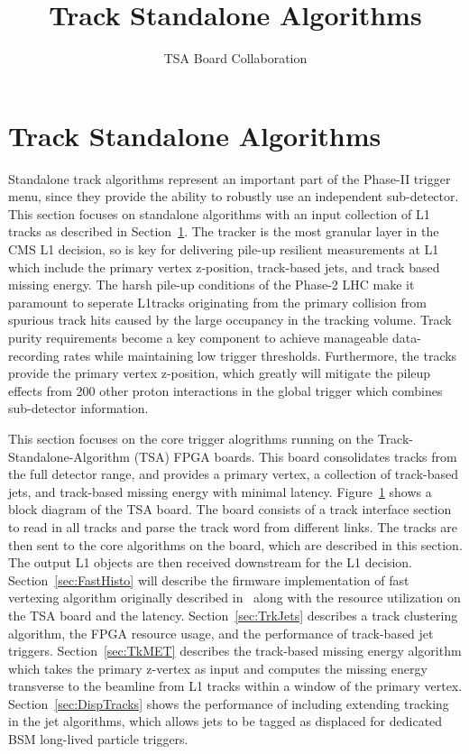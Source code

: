 \documentclass[12pt,a4paper]{article}
\author{TSA Board Collaboration}
\title{Track Standalone Algorithms}
\begin{document}
\section{Track Standalone Algorithms}

Standalone track algorithms represent an important part of the Phase-II trigger menu, since they provide the ability to robustly use an independent sub-detector. This section focuses on standalone algorithms with an input collection of L1 tracks as described in Section~\ref{}. The tracker is the most granular layer in the CMS L1 decision, so is key for delivering pile-up resilient measurements at L1 which include the primary vertex z-position, track-based jets, and track based missing energy. The harsh pile-up conditions of the Phase-2 LHC make it paramount to seperate L1tracks originating from the primary collision from spurious track hits caused by the large occupancy in the tracking volume. Track purity requirements become a key component to achieve manageable data-recording rates while maintaining low trigger thresholds. Furthermore, the tracks provide the primary vertex z-position, which greatly will mitigate the pileup effects from 200 other proton interactions in the global trigger which combines sub-detector information.

This section focuses on the core trigger alogrithms running on the Track-Standalone-Algorithm (TSA) FPGA boards. This board consolidates tracks from the full detector range, and provides a primary vertex, a collection of track-based jets, and track-based missing energy with minimal latency. Figure~\ref{} shows a block diagram of the TSA board. The board consists of a track interface section to read in all tracks and parse the track word from different links. The tracks are then sent to the core algorithms on the board, which are described in this section. The output L1 objects are then received downstream for the L1 decision. Section~\ref{sec:FastHisto} will describe the firmware implementation of fast vertexing algorithm originally described in~\cite{TP} along with the resource utilization on the TSA board and the latency. Section~\ref{sec:TrkJets} describes a track clustering algorithm, the FPGA resource usage, and the performance of track-based jet triggers. Section~\ref{sec:TkMET} describes the track-based missing energy algorithm which takes the primary z-vertex as input and computes the missing energy transverse to the beamline from L1 tracks within a window of the primary vertex. Section~\ref{sec:DispTracks} shows the performance of including extending tracking in the jet algorithms, which allows jets to be tagged as displaced for dedicated BSM long-lived particle triggers.





\end{document}
